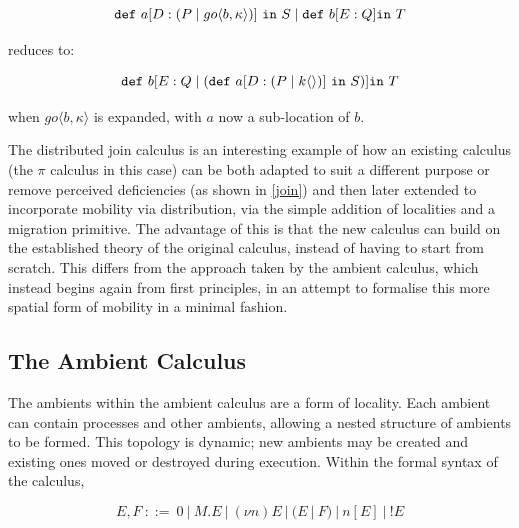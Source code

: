 \begin{equation}
\mathtt{def}\ a[D:(P \;|\; go \langle b, \kappa \rangle)]\ \mathtt{in}\ S
\;|\; \mathtt{def}\ b[E : Q] \mathtt{in}\ T
\end{equation}

\noindent reduces to:

\begin{equation}
\mathtt{def}\ b[E : Q \pc (\mathtt{def}\ a[D:(P \pc k\langle \rangle)]\ \mathtt{in}\ S)] \mathtt{in}\ T
\end{equation}

\noindent when $go \langle b, \kappa \rangle$ is expanded, with $a$
now a sub-location of $b$.

The distributed join calculus is an interesting example of how an
existing calculus (the $\pi$ calculus in this case) can be both
adapted to suit a different purpose or remove perceived deficiencies
(as shown in \ref{join}) and then later extended to incorporate
mobility via distribution, via the simple addition of localities and a
migration primitive.  The advantage of this is that the new calculus
can build on the established theory of the original calculus, instead
of having to start from scratch.  This differs from the approach taken
by the ambient calculus, which instead begins again from first
principles, in an attempt to formalise this more spatial form of
mobility in a minimal fashion.



\subsection{The Ambient Calculus}
\label{ambientcalculus}

The ambients within the ambient calculus \cite{amb} are a form of
locality.  Each ambient can contain processes and other ambients,
allowing a nested structure of ambients to be formed.  This topology
is dynamic; new ambients may be created and existing ones moved or
destroyed during execution.  Within the formal syntax of the calculus,

\begin{equation}
\label{ambsyntax}
  E, F\ ::=\ 
  0\ |\ 
  M.E\ |\ 
  (\nu n)E\ |\ 
  (E\ |\ F)\ |\ 
  n[E]\ |\ 
  !E
\end{equation}

